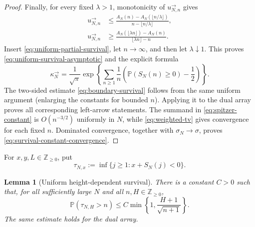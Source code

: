 \documentclass[11pt]{article}
\theoremstyle{plain}
\newtheorem{lemma}{Lemma}[section]
\theoremstyle{definition}
\theoremstyle{remark}
\newcommand{\Z}{\mathbb Z}
\newcommand{\Pp}{\mathbb P}
\begin{document}
\begin{proof}
Finally, for every fixed \(\lambda>1\), monotonicity of
\(u_{N,n}^{\rightarrow}\) gives
\begin{align*}
 u_{N,n}^{\rightarrow}
 &\le
 \frac{A_N(n)-A_N(\lfloor n/\lambda\rfloor)}
      {n-\lfloor n/\lambda\rfloor},\\
 u_{N,n}^{\rightarrow}
 &\ge
 \frac{A_N(\lfloor\lambda n\rfloor)-A_N(n)}
      {\lfloor\lambda n\rfloor-n}.
\end{align*}
Insert \eqref{eq:uniform-partial-survival}, let \(n\to\infty\), and
then let \(\lambda\downarrow1\).  This proves
\eqref{eq:uniform-survival-asymptotic} and the explicit formula
\begin{equation}
 \kappa_N^{\rightarrow}
 =
 \frac1{\sqrt\pi}
 \exp\left\{
   \sum_{n\ge1}\frac1n
   \left(\Pp(S_N(n)\ge0)-\frac12\right)
 \right\}.
 \label{eq:spitzer-constant}
\end{equation}
The two-sided estimate \eqref{eq:boundary-survival} follows from the same
uniform argument (enlarging the constants for bounded \(n\)).  Applying
it to the dual array proves all corresponding left-arrow statements.
The summand in \eqref{eq:spitzer-constant} is \(O(n^{-3/2})\) uniformly
in \(N\), while \eqref{eq:weighted-tv} gives convergence for each fixed
\(n\).  Dominated convergence, together with
\(\sigma_N\to\sigma\), proves
\eqref{eq:survival-constant-convergence}.
\end{proof}


For \(x,y,L\in\Z_{\ge0}\), put
\[
 \tau_{N,x}:=\inf\{j\ge1:x+S_N(j)<0\}.
\]


\begin{lemma}[Uniform height-dependent survival]
\label{lem:height-survival}
There is a constant \(C>0\) such that, for all sufficiently large \(N\)
and all \(n,H\in\Z_{\ge0}\),
\begin{equation}
 \Pp(\tau_{N,H}>n)
 \le C\min\left\{1,\frac{H+1}{\sqrt{n+1}}\right\}.
 \label{eq:height-survival}
\end{equation}
The same estimate holds for the dual array.
\end{lemma}
\end{document}
